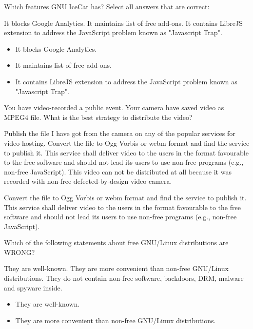\begin{question}[type=exam]
Which features GNU IceCat has? Select all answers that are correct:
\begin{itemize}
\chk It blocks Google Analytics.
\chk It maintains list of free add-ons.
\chk It contains LibreJS extension to address the JavaScript problem known as "Javascript Trap".
\end{itemize}
\end{question}
\begin{solution}
\begin{itemize}
\item It blocks Google Analytics.
\item It maintains list of free add-ons.
\item It contains LibreJS extension to address the JavaScript problem known as "Javascript Trap".
\end{itemize}
\end{solution}

\begin{question}[type=exam]
You have video-recorded a public event. Your camera have saved video as MPEG4 file. What is the best strategy to distribute the video?
\begin{itemize}
\chk Publish the file I have got from the camera on any of the popular services for video hosting.
\chk Convert the file to Ogg Vorbis or webm format and find the service to publish it. This service shall deliver video to the users in the format favourable to the free software and should not lead its users to use non-free programs (e.g., non-free JavaScript).
\chk This video can not be distributed at all because it was recorded with non-free defected-by-design video camera.
\end{itemize}
\end{question}
\begin{solution}
Convert the file to Ogg Vorbis or webm format and find the service to publish it. This service shall deliver video to the users in the format favourable to the free software and should not lead its users to use non-free programs (e.g., non-free JavaScript).
\end{solution}


\begin{question}[type=exam]
Which of the following statements about free GNU/Linux distributions are WRONG?
\begin{itemize}
\chk They are well-known.
\chk They are more convenient than non-free GNU/Linux distributions.
\chk They do not contain non-free software, backdoors, DRM, malware and spyware inside.
\end{itemize}
\end{question}
\begin{solution}
\begin{itemize}
\item They are well-known.
\item They are more convenient than non-free GNU/Linux distributions.
\end{itemize}
\end{solution}


